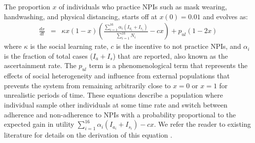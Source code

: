 The proportion $x$ of individuals who practice NPIs such as mask wearing, handwashing, and physical distancing, starts off at $x(0)=0.01$ and evolves as: 
\begin{eqnarray}
\frac{dx}{dt} &= &\kappa x (1-x) \left(\frac{\sum_{i=1}^{16}\alpha_i(I_{a_i} + I_{s_i})}{\sum_{i=1}^{16} N_i} - c x\right) + p_{ul}(1-2 x) 
\label{xeqn_new}
\end{eqnarray}
where $\kappa$ is the social learning rate, $c$ is the incentive to not practice NPIs, and $\alpha_i$ is the fraction of total cases ($I_a + I_s$) that are reported, also known as the ascertainment rate.  The $p_{ul}$ term is a phenomenological term that represents the effects of social heterogeneity and influence from external populations that prevents the system from remaining arbitrarily close to $x=0$ or $x=1$ for unrealistic periods of time.  These equations describe a population where individual sample other individuals at some time rate and switch between adherence and non-adherence to NPIs with a probability proportional to the expected gain in utility $\sum_{i=1}^{16}\alpha_i(I_{a_i} + I_{s_i}) - c x$. We refer the reader to existing literature for details on the derivation of this equation \cite{bauch2005imitation,innes2013impact,thampi2018socio,bauch2012evolutionary,oraby2014influence}. 

